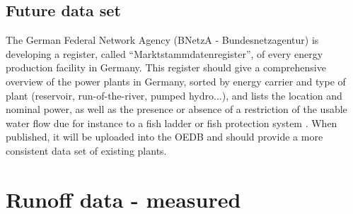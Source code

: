\subsection{Future data set}

The German Federal Network Agency (BNetzA - Bundesnetzagentur) is developing a register, called ``Marktstammdatenregister'', of every energy production facility in Germany. This register should give a comprehensive overview of the power plants in Germany, sorted by energy carrier and type of plant (reservoir, run-of-the-river, pumped hydro...), and lists the location and nominal power, as well as the presence or absence of a restriction of the usable water flow due for instance to a fish ladder or fish protection system \cite{MaStR}. \newline
When published, it will be uploaded into the OEDB and should provide a more consistent data set of existing plants.

\section{Runoff data - measured}

\label{sec:meas_runoff}

